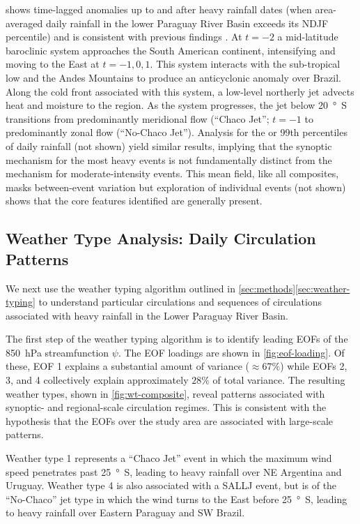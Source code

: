 \documentclass{ametsoc}
\begin{document}
 shows time-lagged anomalies up to and after heavy rainfall dates (when area-averaged daily rainfall in the lower Paraguay River Basin exceeds its NDJF  percentile) and is consistent with previous findings \citep{Marengo2004,Salio:2007gd,Marwan2015}.
At $t=-2$ a mid-latitude baroclinic system approaches the South American continent, intensifying and moving to the East at $t=-1,0,1$.
This system interacts with the sub-tropical low and the Andes Mountains to produce an anticyclonic anomaly over Brazil.
Along the cold front associated with this system, a low-level northerly jet advects  heat and moisture to the region.
As the system progresses, the jet below \SI{20}{\degree S} transitions from predominantly meridional flow (``Chaco Jet''; $t=-1$ to predominantly zonal flow (``No-Chaco Jet'').
Analysis for the  or 99th percentiles of daily rainfall (not shown) yield similar results, implying that the synoptic mechanism for the most heavy events is not fundamentally distinct from the mechanism for moderate-intensity events.
This mean field, like all composites, masks between-event variation but exploration of individual events (not shown) shows that the core features identified are generally present.

\subsection{Weather Type Analysis: Daily Circulation Patterns} \label{sec:weather-types}

We next use the weather typing algorithm outlined in \cref{sec:methods}\ref{sec:weather-typing} to understand particular circulations and sequences of circulations associated with heavy rainfall in the Lower Paraguay River Basin.

The first step of the weather typing algorithm is to identify leading EOFs of the \SI{850}{\hecto\pascal} streamfunction $\psi$.
The EOF loadings are shown in \cref{fig:eof-loading}.
Of these, EOF 1 explains a substantial amount of variance ($\approx 67\%$) while EOFs 2, 3, and 4 collectively explain approximately $28\%$ of total variance.
The resulting weather types, shown in \cref{fig:wt-composite}, reveal patterns associated with synoptic- and regional-scale circulation regimes.
This is consistent with the hypothesis that the EOFs over the study area are associated with large-scale patterns.

Weather type 1 represents a ``Chaco Jet'' event \citep{Salio:2002ev} in which the maximum wind speed penetrates past \SI{25}{\degree S}, leading to heavy rainfall over NE Argentina and Uruguay.
Weather type 4 is also associated with a SALLJ event, but is of the ``No-Chaco'' jet type in which the wind turns to the East before \SI{25}{\degree S}, leading to heavy rainfall over Eastern Paraguay and SW Brazil.
\end{document}
